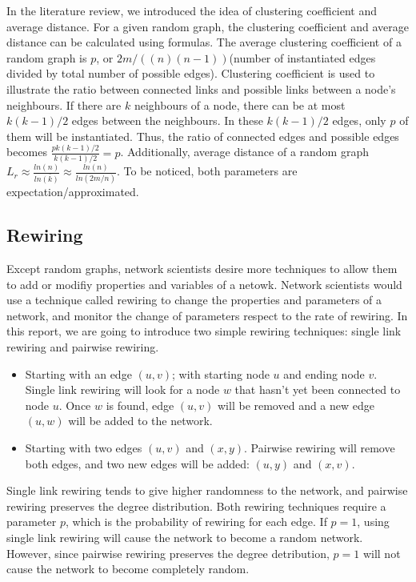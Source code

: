 \documentclass[12pt]{article}
\begin{document}
{\noindent
In the literature review\cite{litreview}, we introduced the idea of clustering coefficient and average distance. For a given random graph, the clustering coefficient and average distance can be calculated using formulas.\cite{barabási2016network} The average clustering coefficient of a random graph is $p$, or $2m/((n)(n-1))$(number of instantiated edges divided by total number of possible edges). Clustering coefficient is used to illustrate the ratio between connected links and possible links between a node's neighbours. If there are $k$ neighbours of a node, there can be at most $k(k-1)/2$ edges between the neighbours. In these $k(k-1)/2$ edges, only $p$ of them will be instantiated. Thus, the ratio of connected edges and possible edges becomes $\frac{pk(k-1)/2}{k(k-1)/2}=p$. Additionally, average distance of a random graph $L_r \approx \frac{ln(n)}{ln\bar{(k)}}\approx \frac{ln(n)}{ln(2m/n)}$. To be noticed, both parameters are expectation/approximated.

\subsection{Rewiring}
\label{rewiring}
Except random graphs, network scientists desire more techniques to allow them to add or modifiy properties and variables of a netowk. Network scientists would use a technique called rewiring to change the properties and parameters of a network, and monitor the change of parameters respect to the rate of rewiring.\cite{network_rewiring} In this report, we are going to introduce two simple rewiring techniques: single link rewiring and pairwise rewiring.\\
\begin{itemize}
    \item Starting with an edge $(u,v)$; with starting node $u$ and ending node $v$. Single link rewiring will look for a node $w$ that hasn't yet been connected to node $u$. Once $w$ is found, edge $(u,v)$ will be removed and a new edge $(u,w)$ will be added to the network. 
    \item Starting with two edges $(u,v)$ and $(x,y)$. Pairwise rewiring will remove both edges, and two new edges will be added: $(u,y)$ and $(x,v)$.
\end{itemize}
\noindent
Single link rewiring tends to give higher randomness to the network, and pairwise rewiring preserves the degree distribution. Both rewiring techniques require a parameter $p$, which is the probability of rewiring for each edge. If $p=1$, using single link rewiring will cause the network to become a random network. However, since pairwise rewiring preserves the degree detribution, $p=1$ will not cause the network to become completely random.

}
\end{document}
